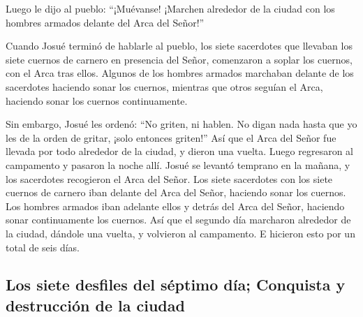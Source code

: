  Luego le dijo al pueblo: ``¡Muévanse! ¡Marchen alrededor
de la ciudad con los hombres armados delante del Arca del Señor!''

 Cuando Josué terminó de hablarle al pueblo, los siete
sacerdotes que llevaban los siete cuernos de carnero en presencia del
Señor, comenzaron a soplar los cuernos, con el Arca tras ellos.
 Algunos de los hombres armados marchaban delante de los
sacerdotes haciendo sonar los cuernos, mientras que otros seguían el
Arca, haciendo sonar los cuernos continuamente.

 Sin embargo, Josué les ordenó: ``No griten, ni hablen.
No digan nada hasta que yo les de la orden de gritar, ¡solo entonces
griten!''  Así que el Arca del Señor fue llevada por todo
alrededor de la ciudad, y dieron una vuelta. Luego regresaron al
campamento y pasaron la noche allí.  Josué se levantó
temprano en la mañana, y los sacerdotes recogieron el Arca del Señor.
 Los siete sacerdotes con los siete cuernos de carnero
iban delante del Arca del Señor, haciendo sonar los cuernos. Los hombres
armados iban adelante ellos y detrás del Arca del Señor, haciendo sonar
continuamente los cuernos.  Así que el segundo día
marcharon alrededor de la ciudad, dándole una vuelta, y volvieron al
campamento. E hicieron esto por un total de seis días.

\hypertarget{los-siete-desfiles-del-suxe9ptimo-duxeda-conquista-y-destrucciuxf3n-de-la-ciudad}{%
\subsection{Los siete desfiles del séptimo día; Conquista y destrucción
de la
ciudad}\label{los-siete-desfiles-del-suxe9ptimo-duxeda-conquista-y-destrucciuxf3n-de-la-ciudad}}

